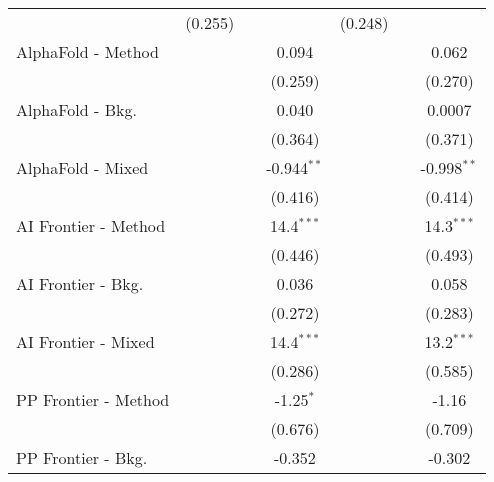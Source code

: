 \begin{tabular}{lcccccc}
                                  & (0.255)       &                &               & (0.248)      &                &   \\   
   AlphaFold - Method             &               &                & 0.094         &              &                & 0.062\\   
                                  &               &                & (0.259)       &              &                & (0.270)\\   
   AlphaFold - Bkg.               &               &                & 0.040         &              &                & 0.0007\\   
                                  &               &                & (0.364)       &              &                & (0.371)\\   
   AlphaFold - Mixed              &               &                & -0.944$^{**}$ &              &                & -0.998$^{**}$\\   
                                  &               &                & (0.416)       &              &                & (0.414)\\   
   AI Frontier - Method           &               &                & 14.4$^{***}$  &              &                & 14.3$^{***}$\\   
                                  &               &                & (0.446)       &              &                & (0.493)\\   
   AI Frontier - Bkg.             &               &                & 0.036         &              &                & 0.058\\   
                                  &               &                & (0.272)       &              &                & (0.283)\\   
   AI Frontier - Mixed            &               &                & 14.4$^{***}$  &              &                & 13.2$^{***}$\\   
                                  &               &                & (0.286)       &              &                & (0.585)\\   
   PP Frontier - Method           &               &                & -1.25$^{*}$   &              &                & -1.16\\   
                                  &               &                & (0.676)       &              &                & (0.709)\\   
   PP Frontier - Bkg.             &               &                & -0.352        &              &                & -0.302\\   

\end{tabular}
